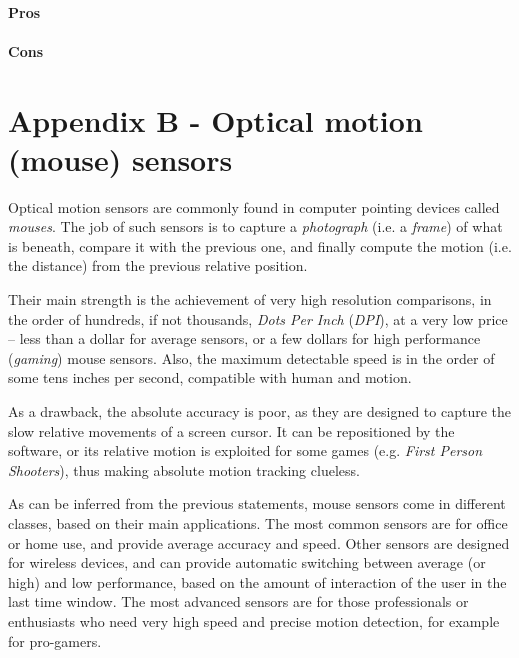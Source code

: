 \documentclass[a4paper,10pt]{article}
\begin{document}
\begin{multicols}{2}
\paragraph{Pros}
\TODO


\paragraph{Cons}
\TODO


\section{Appendix B - Optical motion (mouse) sensors}

Optical motion sensors are commonly found in computer pointing devices called
\emph{mouses}. The job of such sensors is to capture a \emph{photograph}
(i.e. a \emph{frame}) of what is beneath, compare it with the previous one,
and finally compute the motion (i.e. the distance) from the previous relative
position.

Their main strength is the achievement of very high resolution comparisons, in
the order of hundreds, if not thousands, \emph{Dots Per Inch} (\emph{DPI}), at
a very low price -- less than a dollar for average sensors, or a few dollars
for high performance (\emph{gaming}) mouse sensors. Also, the maximum
detectable speed is in the order of some tens inches per second, compatible
with human and motion.

As a drawback, the absolute accuracy is poor, as they are designed to capture
the slow relative movements of a screen cursor. It can be repositioned by
the software, or its relative motion is exploited for some games (e.g.
\emph{First Person Shooters}), thus making absolute motion tracking clueless.

As can be inferred from the previous statements, mouse sensors come in
different classes, based on their main applications. The most common sensors
are for office or home use, and provide average accuracy and speed. Other
sensors are designed for wireless devices, and can provide automatic switching
between average (or high) and low performance, based on the amount of
interaction of the user in the last time window. The most advanced sensors are
for those professionals or enthusiasts who need very high speed and precise
motion detection, for example for pro-gamers.



\end{multicols}
\end{document}
